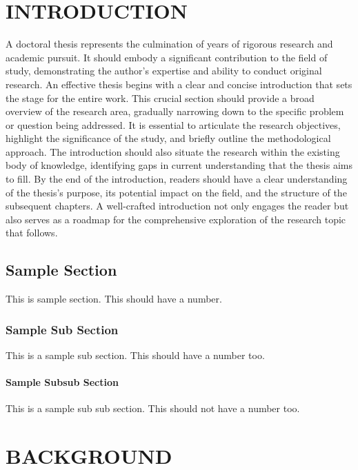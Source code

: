 \documentclass{kgtu}
\begin{document}


\chapter{INTRODUCTION}
A doctoral thesis represents the culmination of years of rigorous research and academic pursuit. It should embody a significant contribution to the field of study, demonstrating the author's expertise and ability to conduct original research. \cite{oztoprak2023technological}An effective thesis begins with a clear and concise introduction that sets the stage for the entire work. This crucial section should provide a broad overview of the research area, gradually narrowing down to the specific problem or question being addressed. It is essential to articulate the research objectives, highlight the significance of the study, and briefly outline the methodological approach. \cite{butun2021application}The introduction should also situate the research within the existing body of knowledge, identifying gaps in current understanding that the thesis aims to fill. By the end of the introduction, readers should have a clear understanding of the thesis's purpose, its potential impact on the field, and the structure of the subsequent chapters. A well-crafted introduction not only engages the reader but also serves as a roadmap for the comprehensive exploration of the research topic that follows.\cite{oztoprak2023holistic}
\section{Sample Section}
This is sample section. This should have a number.
\lipsum[1-3]
\subsection{Sample Sub Section}
This is a sample sub section. This should have a number too.
\lipsum[4-5]
\subsubsection{Sample Subsub Section}
This is a sample sub sub section. This should not have a number too.
\lipsum[6-7]
\chapter{BACKGROUND}
\end{document}
